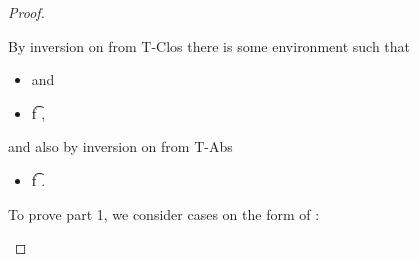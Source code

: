 \begin{lemma}
\begin{proof}
\begin{case}[T-App]
\begin{itemize}
\begin{subcase}[B-BetaClosure]
         By inversion on  from T-Clos
         there is some environment {\propenvc{}} such that
         \begin{itemize}
           \item
               and
            \item
  \judgement {\propenvc{}} {\abs {\x{}} {\s{}} {}} {\ArrowOne {\x{}} {\s{}}
                                                       {\t{f}}
                                                       {
                                                                   {}}
                                                       {}}
                {
                            {}}
                {},
         \end{itemize}
         and also by inversion on  from T-Abs
         \begin{itemize}
           \item
  { \judgement {\propenvc{}, {\isprop {\s{}} {\x{}}}}
              {} {\t{f}}
               {
                           {}}
               {}}.
         \end{itemize}

         To prove part 1, we consider cases on the form of :


\end{subcase}
\end{itemize}
\end{case}
\end{proof}
\end{lemma}
